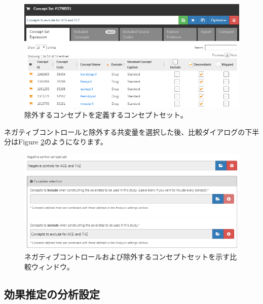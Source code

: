\documentclass[
  11pt]{book}
\theoremstyle{definition}
\theoremstyle{definition}
\theoremstyle{definition}
\theoremstyle{definition}
\theoremstyle{remark}
\begin{document}
\begin{figure}

{\centering \includegraphics[width=1\linewidth]{images/PopulationLevelEstimation/covsToExclude} 

}

\caption{除外するコンセプトを定義するコンセプトセット。}\label{fig:covsToExclude}
\end{figure}

ネガティブコントロールと除外する共変量を選択した後、比較ダイアログの下半分はFigure \ref{fig:comparisons2}のようになります。

\begin{figure}

{\centering \includegraphics[width=1\linewidth]{images/PopulationLevelEstimation/comparisons2} 

}

\caption{ネガティブコントロールおよび除外するコンセプトセットを示す比較ウィンドウ。}\label{fig:comparisons2}
\end{figure}

\subsection{効果推定の分析設定}\label{ux52b9ux679cux63a8ux5b9aux306eux5206ux6790ux8a2dux5b9a}
\end{document}
